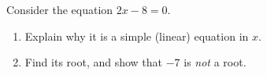 Consider the equation $2x-8=0$.
\begin{enumerate}
\item[(a)] Explain why it is a simple (linear) equation in $x$.
\item[(b)] Find its root, and show that $-7$ is \emph{not} a root.
\end{enumerate}
